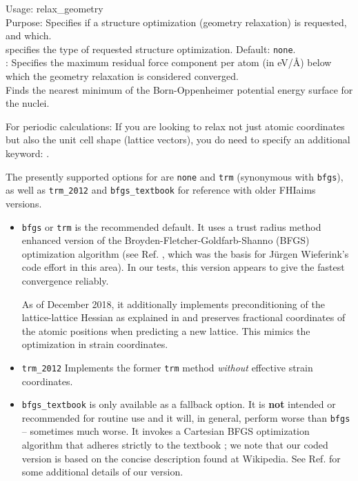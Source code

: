 {
  \noindent
  Usage: relax\_geometry   \\[1.0ex]
  Purpose: Specifies if a structure optimization (geometry relaxation)
    is requested, and which. \\[1.0ex]
   specifies the type of requested structure
    optimization. Default: \texttt{none}. \\
  : Specifies the maximum residual
    force component per atom (in eV/{\AA}) below which the geometry
    relaxation is considered converged. \\
}
Finds the nearest minimum of the Born-Oppenheimer potential energy
surface for the nuclei.

For periodic calculations: If you are looking to relax not just atomic
coordinates but also the unit cell shape (lattice vectors), you do
need to specify an additional keyword: .

The presently supported options for  are \texttt{none} and
\texttt{trm} (synonymous with \texttt{bfgs}), as well as \texttt{trm\_2012} and 
\texttt{bfgs\_textbook} for reference with older FHIaims versions.
\begin{itemize}
  \item \texttt{bfgs} or \texttt{trm} is the recommended default. It
    uses a trust radius method enhanced 
    version of the Broyden-Fletcher-Goldfarb-Shanno (BFGS) optimization
    algorithm (see Ref. \cite{Nocedal06-numopt}, which was the basis for
    J\"urgen Wieferink's code effort in this area). In our tests, this version
    appears to give the fastest convergence reliably.
    
    As of December 2018, it additionally implements preconditioning of the 
    lattice-lattice Hessian as 
	  explained in  and 
	  preserves fractional coordinates of the atomic positions when predicting 
	  a new lattice. This mimics the optimization in strain coordinates. 
	  \cite{Pfrommer1997}
	  \newline
	\item \texttt{trm\_2012} Implements the former \texttt{trm} method \emph{without} 
	effective strain coordinates.
		\newline
  \item \texttt{bfgs\_textbook} is only available as a fallback
    option. It is \textbf{not} 
    intended or recommended for routine use and it will, in general,
    perform worse than \texttt{bfgs} -- sometimes much worse. It invokes
    a Cartesian BFGS optimization algorithm that adheres strictly to
    the textbook \cite{NumericalRecipes}; we note that our coded
    version is based on the concise description found at Wikipedia.  
    See Ref. \cite{Blum08} for some additional details of our version.
\end{itemize}

